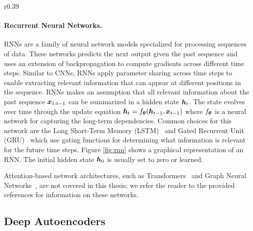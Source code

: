 \vspace{-3mm}
\begin{wrapfigure}{r}{0.39\textwidth}
	\centering
	\vspace{-3mm}
	\resizebox{0.39\textwidth}{!}{
		
	}
	\captionsetup{width=.95\linewidth}
	\caption{Graphical representation of RNN.}
	\vspace{-3mm}
	\label{fig:rnn}
\end{wrapfigure}
\paragraph{Recurrent Neural Networks.} RNNs are a family of neural network models specialized for processing sequences of data. These networks predicts the next output given the past sequence and uses an extension of backpropagation to compute gradients across different time steps. 
Similar to CNNs, RNNs apply parameter sharing across time steps to enable extracting relevant information that can appear at different positions in the sequence. RNNs makes an assumption that all relevant information about the past sequence ${\bm{x}}_{1:t-1}$ can be summarized in a hidden state ${\bm{h}}_t$. The state evolves over time through the update equation ${\bm{h}}_t = f_{{\bm{\theta}}}({\bm{h}}_{t-1}, {\bm{x}}_{t-1})$ where $f_{{\bm{\theta}}}$ is a neural network for capturing the long-term dependencies. Common choices for this network are the Long Short-Term Memory (LSTM)~\cite{hochreiter1997long} and Gated Recurrent Unit (GRU)~\cite{chung2014empirical} which use gating functions for determining what information is relevant for the future time steps. Figure \ref{fig:rnn} shows a graphical representation of an RNN. The initial hidden state ${\bm{h}}_0$ is usually set to zero or learned. 

\vspace{3mm}
\noindent Attention-based network architectures, such as Transformers~\cite{vaswani2017attention, dosovitskiy2020image} and Graph Neural Networks~\cite{battaglia2018relational, zhou2020graph}, are not covered in this thesis; we refer the reader to the provided references for information on these networks.



\subsection{Deep Autoencoders}\label{sec:deep_autoencoders}

